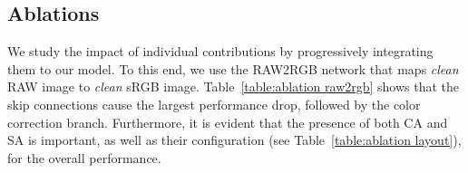\documentclass[10pt,twocolumn,letterpaper]{article}
\begin{document}
\subsection{Ablations}
We study the impact of individual contributions by progressively integrating them to our model. 
To this end, we use the RAW2RGB network that maps \emph{clean} RAW image to \emph{clean} sRGB image. 
Table~\ref{table:ablation raw2rgb} shows that the skip connections cause the largest performance drop, followed by the color correction branch. 
Furthermore, it is evident that the presence of both CA and SA is important, as well as their configuration (see Table~\ref{table:ablation layout}), for the overall performance. 



\begin{table}[t]
\centering
\caption{Ablation study: RAW2RGB branch.}
\label{table:ablation raw2rgb}
\vspace{-2.5mm}
\setlength{\tabcolsep}{7.3pt}
\vspace*{-1.6mm}
\end{table}

\begin{table}[t]
\centering
\caption{Layout of SA and CA in DAB.}
\label{table:ablation layout}
\vspace{-2.5mm}
\setlength{\tabcolsep}{15pt}
\vspace*{-1.6mm}
\end{table}
\end{document}
